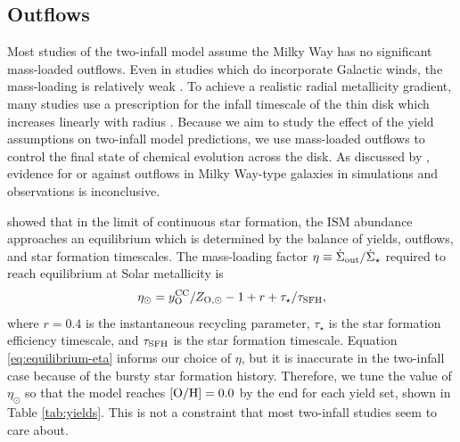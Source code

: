 \documentclass[twocolumn,twocolappendix,linenumbers]{aastex631}
\newcommand{\todo}[1]{{\color{red}#1}}
\newcommand{\mathOH}{{\rm [O/H]}}
\begin{document}
\subsection{Outflows}
\label{sec:outflows}

Most studies of the two-infall model assume the Milky Way has no significant mass-loaded outflows. Even in studies which do incorporate Galactic winds, the mass-loading is relatively weak \citep[e.g., $\eta\approx0.2$ in][]{palicio_analytic_2023}. To achieve a realistic radial metallicity gradient, many studies use a prescription for the infall timescale of the thin disk which increases linearly with radius \citep[e.g.,][]{chiappini_chemical_1997,romano_mass_2000}. Because we aim to study the effect of the yield assumptions on two-infall model predictions, we use mass-loaded outflows to control the final state of chemical evolution across the disk. As discussed by \citet{johnson_milky_2024}, evidence for or against outflows in Milky Way-type galaxies in simulations and observations is inconclusive.

\citet{weinberg_equilibrium_2017} showed that in the limit of continuous star formation, the ISM abundance approaches an equilibrium which is determined by the balance of yields, outflows, and star formation timescales. The mass-loading factor $\eta\equiv \dot\Sigma_{\rm out}/\dot\Sigma_\star$ required to reach equilibrium at Solar metallicity is
\begin{equation}
    \label{eq:equilibrium-eta}
    \eta_\odot = y_{\rm O}^{\rm CC} / Z_{\rm O,\odot} - 1 + r + \tau_\star / \tau_{\rm SFH},
\end{equation}
where $r=0.4$ is the instantaneous recycling parameter, $\tau_\star$ is the star formation efficiency timescale, and $\tau_{\rm SFH}$ is the star formation timescale. Equation \ref{eq:equilibrium-eta} informs our choice of $\eta$, but it is inaccurate in the two-infall case because of the bursty star formation history. Therefore, we tune the value of $\eta_\odot$ so that the model reaches $\mathOH=0.0$ by the end for each yield set, shown in Table \ref{tab:yields}.
\todo{This is not a constraint that most two-infall studies seem to care about.}
\end{document}
